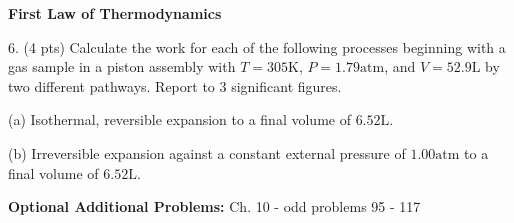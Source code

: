 \documentclass[11pt]{article}
\begin{document}

%

\pagebreak

\textbf{First Law of Thermodynamics}

6. (4 pts) Calculate the work for each of the following processes beginning with a gas
sample in a piston assembly with $T=305\text{K}$, $P=1.79\text{atm}$, and
$V=52.9\text{L}$ by two different pathways. Report to 3 significant figures.

(a) Isothermal, reversible expansion to a final volume of $6.52\text{L}$.

(b) Irreversible expansion against a constant external pressure of $1.00\text{atm}$
to a final volume of $6.52\text{L}$.

\vfill
\textbf{Optional Additional Problems:} Ch. 10 - odd problems 95 - 117
\end{document}
